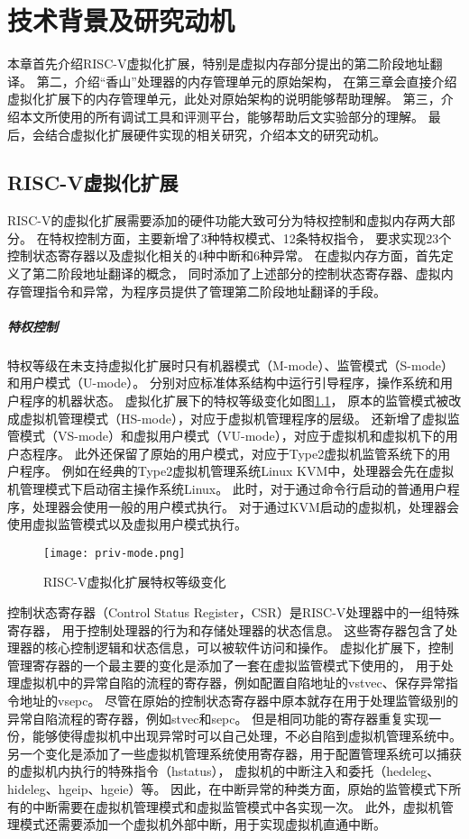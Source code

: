 \chapter{技术背景及研究动机}

本章首先介绍RISC-V虚拟化扩展，特别是虚拟内存部分提出的第二阶段地址翻译。
第二，介绍“香山”处理器的内存管理单元的原始架构，
在第三章会直接介绍虚拟化扩展下的内存管理单元，此处对原始架构的说明能够帮助理解。
第三，介绍本文所使用的所有调试工具和评测平台，能够帮助后文实验部分的理解。
最后，会结合虚拟化扩展硬件实现的相关研究，介绍本文的研究动机。

\section{RISC-V虚拟化扩展}
RISC-V的虚拟化扩展需要添加的硬件功能大致可分为特权控制和虚拟内存两大部分。
在特权控制方面，主要新增了3种特权模式、12条特权指令，
要求实现23个控制状态寄存器以及虚拟化相关的4种中断和6种异常。
在虚拟内存方面，首先定义了第二阶段地址翻译的概念，
同时添加了上述部分的控制状态寄存器、虚拟内存管理指令和异常，为程序员提供了管理第二阶段地址翻译的手段。

\paragraph{特权控制}
特权等级在未支持虚拟化扩展时只有机器模式（M-mode）、监管模式（S-mode）和用户模式（U-mode）。
分别对应标准体系结构中运行引导程序，操作系统和用户程序的机器状态。
虚拟化扩展下的特权等级变化如图\ref*{fig:priv-mode}，
原本的监管模式被改成虚拟机管理模式（HS-mode），对应于虚拟机管理程序的层级。
还新增了虚拟监管模式（VS-mode）和虚拟用户模式（VU-mode），对应于虚拟机和虚拟机下的用户态程序。
此外还保留了原始的用户模式，对应于Type2虚拟机监管系统下的用户程序。
例如在经典的Type2虚拟机管理系统Linux KVM中，处理器会先在虚拟机管理模式下启动宿主操作系统Linux。
此时，对于通过命令行启动的普通用户程序，处理器会使用一般的用户模式执行。
对于通过KVM启动的虚拟机，处理器会使用虚拟监管模式以及虚拟用户模式执行。

\begin{figure}[htbp]
    \centering
    \texttt{[image: priv-mode.png]}
    \caption{RISC-V虚拟化扩展特权等级变化}
    \label{fig:priv-mode}
\end{figure}

控制状态寄存器（Control Status Register，CSR）是RISC-V处理器中的一组特殊寄存器，
用于控制处理器的行为和存储处理器的状态信息。
这些寄存器包含了处理器的核心控制逻辑和状态信息，可以被软件访问和操作。
虚拟化扩展下，控制管理寄存器的一个最主要的变化是添加了一套在虚拟监管模式下使用的，
用于处理虚拟机中的异常自陷的流程的寄存器，例如配置自陷地址的vstvec、保存异常指令地址的vsepc。
尽管在原始的控制状态寄存器中原本就存在用于处理监管级别的异常自陷流程的寄存器，例如stvec和sepc。
但是相同功能的寄存器重复实现一份，能够使得虚拟机中出现异常时可以自己处理，不必自陷到虚拟机管理系统中。
另一个变化是添加了一些虚拟机管理系统使用寄存器，用于配置管理系统可以捕获的虚拟机内执行的特殊指令（hstatus），
虚拟机的中断注入和委托（hedeleg、hideleg、hgeip、hgeie）等。
因此，在中断异常的种类方面，原始的监管模式下所有的中断需要在虚拟机管理模式和虚拟监管模式中各实现一次。
此外，虚拟机管理模式还需要添加一个虚拟机外部中断，用于实现虚拟机直通中断。


